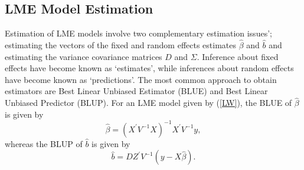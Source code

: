 \documentclass[12pt, a4paper]{report}
\theoremstyle{plain}
\theoremstyle{definition}
\theoremstyle{remark}
\begin{document}
\subsection{LME Model Estimation}
Estimation of LME models involve two complementary estimation issues'; estimating the vectors of the fixed and random effects estimates $\hat{\beta}$ and $\hat{b}$ and estimating the variance covariance matrices $D$ and $\Sigma$. Inference about fixed effects have become known as `estimates', while inferences about random effects have become known as `predictions'. The most common approach to obtain estimators are Best Linear Unbiased Estimator (BLUE) and Best Linear Unbiased Predictor (BLUP). For an LME model given by (\ref{LW}), the BLUE of $\hat{\beta}$ is given by
\begin{equation}
\hat{\beta} = (X^\prime V^{-1}X)^{-1}X^\prime V^{-1}y,
\end{equation}whereas the BLUP of $\hat{b}$ is given by
\begin{equation}
\hat{b} = DZ^{\prime} V^{-1} (y-X\hat{\beta}).
\end{equation}
\end{document}
